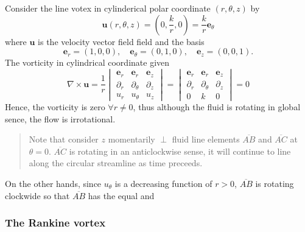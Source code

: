 
Consider the line votex in cylinderical polar coordinate $(r,\theta,z)$ by
\begin{equation}
\textbf{u}\left(r,\theta,z\right) = \left(0,\frac{k}{r},0\right) = \frac{k}{r} \textbf{e}_{\theta}
\end{equation}
where $\textbf{u}$ is the velocity vector field field and the basis 
\begin{equation}
\textbf{e}_r = \left(1,0,0\right),\quad
\textbf{e}_\theta = \left(0,1,0\right),\quad
\textbf{e}_z = \left(0,0,1\right).
\end{equation}
The vorticity in cylindrical coordinate given 
\begin{equation}
\nabla \times \textbf{u} = \frac{1}{r}\begin{vmatrix}
\textbf{e}_r & \textbf{e}_r & \textbf{e}_z \\
\partial_r & \partial_\theta & \partial_z\\
u_r & u_\theta & u_z
\end{vmatrix}
= \begin{vmatrix}
\textbf{e}_r & \textbf{e}_r & \textbf{e}_z \\
\partial_r & \partial_\theta & \partial_z\\
0 & k & 0
\end{vmatrix} = 0
\end{equation}
Hence, the vorticity is zero $\forall r\neq 0$, thus although the fluid is rotating in global sence, the flow is irrotational. 

\begin{quote}
	Note that consider $z$ momentarily $\perp$ fluid line elements $\overline{AB}$  and $\overline{AC}$ at $\theta=0$.
$\overline{AC}$ is rotating in an anticlockwise sense, it will continue to line along the circular streamline as time preceeds.
\end{quote}

On the other hands, since $u_\theta$ is a decreasing function of $r>0$, $\overline{AB}$ is rotating clockwide so that $\overline{AB}$ has the equal and 

\subsubsection{The Rankine vortex} %

